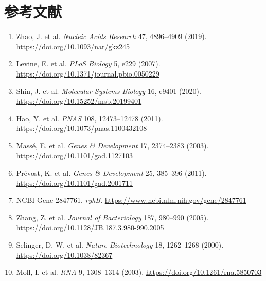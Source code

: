 \documentclass[UTF8,a4paper,11pt,fontset=windows]{ctexart}
\begin{document}
\section*{参考文献}
\begin{enumerate}[label={\arabic*.}]
\item Zhao, J. et al. \textit{Nucleic Acids Research} 47, 4896--4909 (2019). \url{https://doi.org/10.1093/nar/gkz245}
\item Levine, E. et al. \textit{PLoS Biology} 5, e229 (2007). \url{https://doi.org/10.1371/journal.pbio.0050229}
\item Shin, J. et al. \textit{Molecular Systems Biology} 16, e9401 (2020). \url{https://doi.org/10.15252/msb.20199401}
\item Hao, Y. et al. \textit{PNAS} 108, 12473--12478 (2011). \url{https://doi.org/10.1073/pnas.1100432108}
\item Mass\'e, E. et al. \textit{Genes \& Development} 17, 2374--2383 (2003). \url{https://doi.org/10.1101/gad.1127103}
\item Pr\'evost, K. et al. \textit{Genes \& Development} 25, 385--396 (2011). \url{https://doi.org/10.1101/gad.2001711}
\item NCBI Gene 2847761, \textit{ryhB}. \url{https://www.ncbi.nlm.nih.gov/gene/2847761}
\item Zhang, Z. et al. \textit{Journal of Bacteriology} 187, 980--990 (2005). \url{https://doi.org/10.1128/JB.187.3.980-990.2005}
\item Selinger, D. W. et al. \textit{Nature Biotechnology} 18, 1262--1268 (2000). \url{https://doi.org/10.1038/82367}
\item Moll, I. et al. \textit{RNA} 9, 1308--1314 (2003). \url{https://doi.org/10.1261/rna.5850703}
\end{enumerate}
\end{document}
